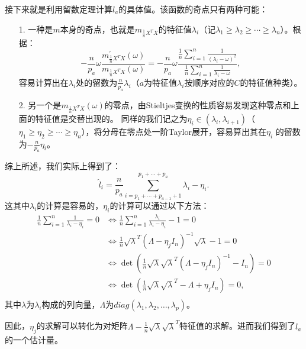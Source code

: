 \documentclass[UTF8,12pt]{ctexart}
\begin{document}
\begin{itemize}
    接下来就是利用留数定理计算$l_a$的具体值。该函数的奇点只有两种可能：
    \begin{itemize}
        \item[1.] 一种是$m$本身的奇点，也就是$m_{\frac{1}{n}X^T X}$的特征值$\lambda_i$（记$\lambda_1 \geq \lambda_2 \geq \cdots \geq \lambda_n$）。根据：
        \[
            -\frac{n}{p_a}\omega \frac{m_{\frac{1}{n}X^T X}^\prime (\omega)}{m_{\frac{1}{n}X^T X} (\omega)} = -\frac{n}{p_a}\omega \frac{
                \frac{1}{n}\sum_{i=1}^n \frac{1}{{(\lambda_i-\omega)}^2}
            }{
                \frac{1}{n}\sum_{i=1}^n \frac{1}{\lambda_i-\omega}
            },
        \] 
        容易计算出在$\lambda_i$处的留数为$\frac{n}{p_a}\lambda_i$（$a$为特征值$\lambda_i$按顺序对应的$C$的特征值种类）。
        \item[2.] 另一个是$m_{\frac{1}{n}X^T X}(\omega)$的零点，由Stieltjes变换的性质容易发现这种零点和上面的特征值是交替出现的。
        同样的我们记之为$\eta_i \in (\lambda_i,\lambda_{i+1})$（$\eta_1 \geq \eta_2 \geq \cdots \geq \eta_n$），将分母在零点处一阶Taylor展开，容易算出其在$\eta_i$
        的留数为$-\frac{n}{p_a}\eta_i$。
    \end{itemize}
    综上所述，我们实际上得到了：
    \[
        \hat{l}_i = \frac{n}{p_a}\sum\limits_{i = p_1+ \cdots + p_{a-1}+1}^{p_1+ \cdots + p_a} \lambda_i - \eta_i.
    \]  
    这其中$\lambda_i$的计算是容易的，$\eta_i$的计算可以通过以下方法：
    \begin{equation*}
        \begin{aligned}
            \frac{1}{n}\sum\limits_{i=1}^n\frac{1}{\lambda_i-\eta_i} = 0
            & \Leftrightarrow \frac{1}{n}\sum\limits_{i=1}^n\frac{\lambda_{i}}{\lambda_i-\eta_i} - 1= 0 \\
            & \Leftrightarrow \frac{1}{n}{\sqrt{\lambda}}^T{(\varLambda -\eta_j I_n)}^{-1} \sqrt{\lambda}-1=0 \\
            & \Leftrightarrow \det(\frac{1}{n}\sqrt{\lambda}{\sqrt{\lambda}}^T{(\varLambda-\eta_j I_n)}^{-1}-I_n) = 0\\
            & \Leftrightarrow \det(\frac{1}{n}\sqrt{\lambda}{\sqrt{\lambda}}^T - \varLambda + \eta_j I_n) = 0,\\
        \end{aligned}
    \end{equation*}
    其中$\lambda$为$\lambda_i$构成的列向量，$\varLambda$为$diag(\lambda_1,\lambda_2,\ldots,\lambda_p)$。
    
    因此，$\eta_j$的求解可以转化为对矩阵$\varLambda -\frac{1}{n}\sqrt{\lambda}{\sqrt{\lambda}}^T$特征值的求解。进而我们得到了$l_a$的一个估计量。


\end{itemize}
\end{document}
